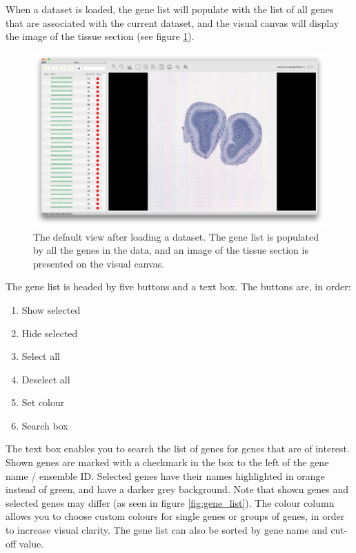 \documentclass[10pt,a4paper,titlepage]{book}
\begin{document}
When a dataset is loaded, the gene list will populate with the list of all genes that are associated with the current dataset, and the visual canvas will display the image of the tissue section (see figure \ref{fig:default_loaded_data}). 
\begin{figure}[h]
	\centering
	\includegraphics[width=0.9\linewidth]{./Pictures/default_dataset_loaded}
	\caption[Default view after loading a dataset]{The default view after loading a dataset. The gene list is populated by all the genes in the data, and an image of the tissue section is presented on the visual canvas.}
	\label{fig:default_loaded_data}
\end{figure}

The gene list is headed by five buttons and a text box. The buttons are, in order:
\begin{enumerate}
\item	Show selected
\item	Hide selected
\item	Select all
\item	Deselect all
\item	Set colour
\item	Search box
\end{enumerate}

The text box enables you to search the list of genes for genes that are of interest. Shown genes are marked with a checkmark in the box to the left of the gene name / ensemble ID. Selected genes have their names highlighted in orange instead of green, and have a darker grey background. Note that shown genes and selected genes may differ (as seen in figure \ref{fig:gene_list}). The colour column allows you to choose custom colours for single genes or groups of genes, in order to increase visual clarity. The gene list can also be sorted by gene name and cut-off value.
\end{document}
